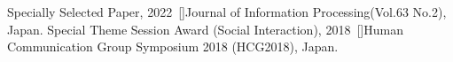 \begin{talks}
    \award
    {Specially Selected Paper, 2022}{}{\normalfont ~[\href{https://www.ipsj.or.jp/award/ssp_award.html}{\small{\websiteSymbol}}]}{Journal of Information Processing(Vol.63 No.2), Japan.}
	\award
    {Special Theme Session Award (Social Interaction), 2018}{}{\normalfont ~[\href{https://www.ieice.org/hcg/symposium2018/sites.google.com/a/hcg-symposium.org/2018/award.html}{\small{\websiteSymbol}}]}{Human Communication Group Symposium 2018 (HCG2018), Japan.}	
\end{talks}
\vspace{-3mm}